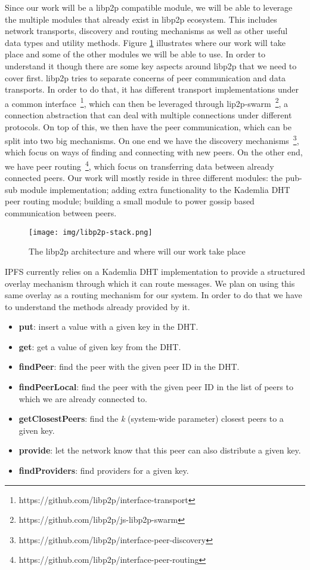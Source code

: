 Since our work will be a libp2p compatible module, we will be able to
leverage the multiple modules that already exist in libp2p ecosystem.
This includes network transports, discovery and routing mechanisms as
well as other useful data types and utility methods. Figure \ref{fig:libp2p-stack}
illustrates where our work will take place and
some of the other modules we will be able to use. In order to understand
it though there are some key aspects around libp2p that we need to cover
first. libp2p tries to separate concerns of peer communication and data
transports. In order to do that, it has different transport implementations
under a common interface~\footnote{https://github.com/libp2p/interface-transport},
which can then be leveraged through lip2p-swarm~\footnote{https://github.com/libp2p/js-libp2p-swarm},
a connection abstraction that can deal with multiple
connections under different protocols. On top of this, we then have the
peer communication, which can be split into two big mechanisms. On one
end we have the discovery mechanisms~\footnote{https://github.com/libp2p/interface-peer-discovery},
which focus on ways of finding and connecting with new peers.
On the other end, we have peer routing~\footnote{https://github.com/libp2p/interface-peer-routing},
which focus on transferring data between already connected
peers. Our work will mostly reside in three different modules: the
pub-sub module implementation; adding extra functionality to the
Kademlia DHT peer routing module; building a small module to power
gossip based communication between peers.

\begin{figure}[hb!]
  \centering
  \texttt{[image: img/libp2p-stack.png]}
  \caption{The libp2p architecture and where will our work take place}
  \label{fig:libp2p-stack}
\end{figure}

IPFS currently relies on a Kademlia DHT implementation to provide a
structured overlay mechanism through which it can route messages. We
plan on using this same overlay as a routing mechanism for our system.
In order to do that we have to understand the methods already provided
by it.

\begin{itemize}
  \item
    \textbf{put}: insert a value with a given key in the DHT.
  \item
    \textbf{get}: get a value of given key from the DHT.
  \item
    \textbf{findPeer}: find the peer with the given peer ID in the DHT.
  \item
    \textbf{findPeerLocal}: find the peer with the given peer ID in the
    list of peers to which we are already connected to.
  \item
    \textbf{getClosestPeers}: find the \emph{k} (system-wide parameter)
    closest peers to a given key.
  \item
    \textbf{provide}: let the network know that this peer can also
    distribute a given key.
  \item
    \textbf{findProviders}: find providers for a given key.
\end{itemize}

